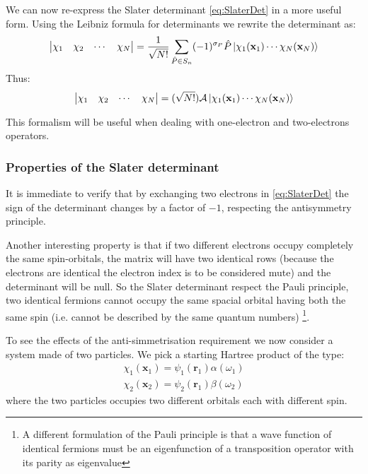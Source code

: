 \documentclass[a4paper,12pt]{article}
\begin{document}
We can now re-express the Slater determinant \eqref{eq:SlaterDet} in a more useful form. Using the Leibniz formula for determinants we rewrite the determinant as:
\begin{equation}\label{eq:SlaterLeibniz}
	\left|
	\begin{matrix}
		   \chi _1 & \chi _2 & \cdots  & \chi _N  \\
	\end{matrix} 
	\right| = \frac{1}{\sqrt{N!}} \sum_{\hat{P} \in S_n} (-1)^{\sigma_P} \hat{P} \ket{\chi_1(\mathbf{x}_1) \cdots   \chi_N(\mathbf{x}_N)}
\end{equation}
Thus:
\begin{equation}
	\left|
	\begin{matrix}
		   \chi _1 & \chi _2 & \cdots  & \chi _N  \\
	\end{matrix} 
	\right| =  (\sqrt{N!}) \mathcal{A} \ket{ \chi_1(\mathbf{x}_1) \cdots   \chi_N(\mathbf{x}_N) }
\end{equation}

This formalism will be useful when dealing with one-electron and two-electrons operators.

\subsubsection{Properties of the Slater determinant}\label{sec:slaterPropr}

It is immediate to verify that by exchanging two electrons in \eqref{eq:SlaterDet} the sign of the determinant changes by a factor of $- 1$, respecting the antisymmetry principle.

Another interesting property is that if two different electrons occupy completely the same spin-orbitals, the matrix will have two identical rows (because the electrons are identical the electron index is to be considered mute) and the determinant will be null. So the Slater determinant respect the Pauli principle, two identical fermions cannot occupy the same spacial orbital having both the same spin (i.e. cannot be described by the same quantum numbers) \footnote{A different formulation of the Pauli principle is that a wave function of identical fermions must be an eigenfunction of a transposition operator with its parity as eigenvalue}.


To see the effects of the anti-simmetrisation requirement we now consider a system made of two particles. We pick a starting Hartree product of the type: 
\begin{align*}
	\chi_{1}(\mathbf{x}_{1}) = \psi_{1}(\mathbf{r}_{1}) \alpha(\omega_{1})\\
	\chi_{2}(\mathbf{x}_{2}) = \psi_{2}(\mathbf{r}_{1}) \beta(\omega_{2})
\end{align*}
where the two particles occupies two different orbitals each with different spin.
\end{document}
